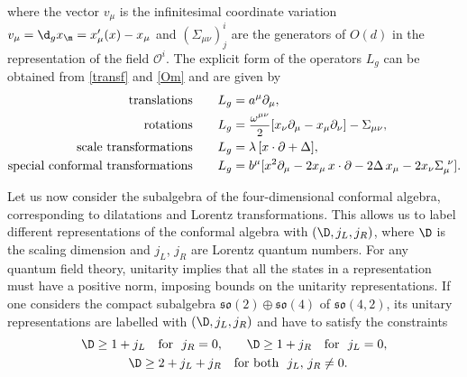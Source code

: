 \documentclass[a4paper,11pt,openright,twoside]{book}
\newcommand{\sdfrac}[2]{\mbox{\small$\displaystyle\frac{#1}{#2}$}}
\numberwithin{equation}{section}
\begin{document}
where the vector $v_\mu$ is the infinitesimal coordinate variation $v_\mu=\d_gx_\m=x'_\mu(x)-x_\mu$ and $(\Sigma_{\mu\nu})^i_j$ are the generators of $O(d)$ in the representation of the field $\mathcal{O}^i$. The explicit form of the operators $L_g$ can be obtained from \eqref{transf} and \eqref{Om} and are given by
\begin{align}
	\text{translations}\qquad L_g&=a^\mu\partial_\mu,\\
	\text{rotations}\qquad L_g&=\sdfrac{\omega^{\mu\nu}}{2}[x_\nu\partial_\mu-x_\mu\partial_\nu]-\Sigma_{\mu\nu},\\
	\text{scale transformations}\qquad L_g&=\lambda\,[x\cdot \partial +\Delta],\\
	\text{special conformal transformations}\qquad L_g&=b^\mu[x^2\partial_\mu-2x_\mu\,x\cdot \partial-2\Delta\,x_\mu-2x_\nu\Sigma_\mu^{\ \nu}].
\end{align}

Let us now consider the subalgebra of the four-dimensional conformal algebra, corresponding to dilatations and Lorentz transformations. This allows us to label different representations of the conformal algebra with $(\D,j_L,j_R)$, where $\D$ is the scaling dimension and $j_L$, $j_R$ are Lorentz quantum numbers.  For any quantum field theory, unitarity implies that all the states in a representation must have a positive norm, imposing bounds on the unitarity representations. If one considers the compact subalgebra $\mathfrak{so}(2)\oplus\mathfrak{so}(4)$ of $\mathfrak{so}(4,2)$, its unitary representations are labelled with $(\D,j_L,j_R)$ and have to satisfy the constraints
\begin{equation}
	\begin{split}
		\D\ge 1+j_L\quad\text{for}\ \ j_R=0,&\qquad \D\ge 1+j_R\quad\text{for}\ \ j_L=0,\\
		\D\ge 2+j_L+j_R&\quad\text{for both}\ \ j_L,\,j_R\ne0.
	\end{split}
\end{equation}
\end{document}

